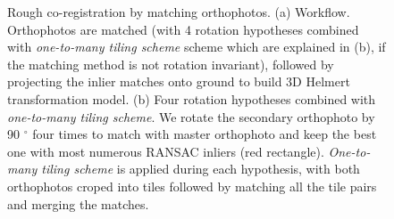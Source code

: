 \begin{figure}[htbp]
    \begin{center}
        \caption{Rough co-registration by matching orthophotos. (a) Workflow. Orthophotos are matched (with 4 rotation hypotheses combined with \textit{one-to-many tiling scheme} scheme which are explained in (b), if the matching method is not rotation invariant), followed by projecting the inlier matches onto ground to build 3D Helmert transformation model. (b) Four rotation hypotheses combined with \textit{one-to-many tiling scheme}. We rotate the secondary orthophoto by 90 $^\circ$ four times to match with master orthophoto and keep the best one with most numerous RANSAC inliers (red rectangle). \textit{One-to-many tiling scheme} is applied during each hypothesis, with both orthophotos croped into tiles followed by matching all the tile pairs and merging the matches.}
        \label{WorkflowOrtho}
    \end{center}
\end{figure}

